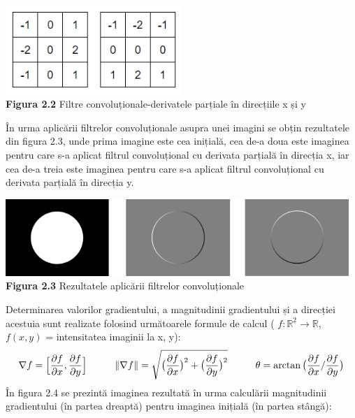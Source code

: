 \documentclass[a4paper,12pt]{report}
\newcommand\tab[1][1cm]{\hspace*{#1}}
\begin{document}
\begin {center} 
	\begin {footnotesize} 
		\includegraphics[width = 67mm]{fig2_2}\\
		\textbf  {Figura 2.2} Filtre convoluționale-derivatele parțiale în direcțiile x și y
	\end {footnotesize} 
\end {center}
\tab În urma aplicării filtrelor convoluționale asupra unei imagini se obțin rezultatele din figura 2.3, unde prima imagine este cea inițială, cea de-a doua este imaginea pentru care s-a aplicat filtrul convoluțional cu derivata parțială în direcția x,
iar cea de-a treia este imaginea pentru care s-a aplicat filtrul convoluțional cu derivata parțială în direcția y.
\begin {center} 
	\begin {footnotesize} 
		\includegraphics[width = 130mm]{fig2_3} \\
		\textbf  {Figura 2.3} Rezultatele aplicării filtrelor convoluționale
	\end {footnotesize} 
\end {center}
\tab Determinarea valorilor gradientului, a magnitudinii gradientului și a direcției acestuia sunt realizate folosind următoarele formule de calcul ( $f:\mathbb{R}^2\rightarrow \mathbb{R}$,  $f(x,y)$ = intensitatea imaginii la x, y): 
	\[\nabla f =  \Bigl[\frac{\partial f}{\partial x}, \frac{\partial f}{\partial y}\Bigr] \tab
	\|\nabla f\| =  \sqrt {\big( \frac{\partial f}{\partial x}\big)^2 + \big(\frac{\partial f}{\partial y}\big)^2} \tab
	\theta = \arctan\big(  \frac{\partial f}{\partial x} /  \frac{\partial f}{\partial y}\big)\]
\tab În figura 2.4 se prezintă imaginea rezultată în urma calculării magnitudinii gradientului (în partea dreaptă) pentru imaginea inițială (în partea stângă):
\end{document}

